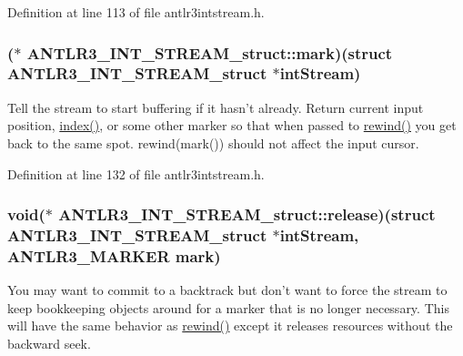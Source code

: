 Definition at line 113 of file antlr3intstream.\-h.

\hypertarget{struct_a_n_t_l_r3___i_n_t___s_t_r_e_a_m__struct_ad59b7290943c5152aa28377343335983}{
\subsubsection[{mark}]{($\ast$ A\-N\-T\-L\-R3\-\_\-\-I\-N\-T\-\_\-\-S\-T\-R\-E\-A\-M\-\_\-struct\-::mark)(struct {\bf A\-N\-T\-L\-R3\-\_\-\-I\-N\-T\-\_\-\-S\-T\-R\-E\-A\-M\-\_\-struct} $\ast$int\-Stream)}}\label{struct_a_n_t_l_r3___i_n_t___s_t_r_e_a_m__struct_ad59b7290943c5152aa28377343335983}
Tell the stream to start buffering if it hasn't already. Return current input position, \hyperlink{struct_a_n_t_l_r3___i_n_t___s_t_r_e_a_m__struct_a5141407fe8b50ff4e87f617811fd54fc}{index()}, or some other marker so that when passed to \hyperlink{struct_a_n_t_l_r3___i_n_t___s_t_r_e_a_m__struct_a8fa6f22f95f34f15d7d085fa4bddfcf8}{rewind()} you get back to the same spot. rewind(mark()) should not affect the input cursor. 

Definition at line 132 of file antlr3intstream.\-h.

\hypertarget{struct_a_n_t_l_r3___i_n_t___s_t_r_e_a_m__struct_aaf72411c29dcfa48673babf667797ba6}{
\subsubsection[{release}]{\setlength{\rightskip}{0pt plus 5cm}void($\ast$ A\-N\-T\-L\-R3\-\_\-\-I\-N\-T\-\_\-\-S\-T\-R\-E\-A\-M\-\_\-struct\-::release)(struct {\bf A\-N\-T\-L\-R3\-\_\-\-I\-N\-T\-\_\-\-S\-T\-R\-E\-A\-M\-\_\-struct} $\ast$int\-Stream, {\bf A\-N\-T\-L\-R3\-\_\-\-M\-A\-R\-K\-E\-R} {\bf mark})}}\label{struct_a_n_t_l_r3___i_n_t___s_t_r_e_a_m__struct_aaf72411c29dcfa48673babf667797ba6}
You may want to commit to a backtrack but don't want to force the stream to keep bookkeeping objects around for a marker that is no longer necessary. This will have the same behavior as \hyperlink{struct_a_n_t_l_r3___i_n_t___s_t_r_e_a_m__struct_a8fa6f22f95f34f15d7d085fa4bddfcf8}{rewind()} except it releases resources without the backward seek. 

